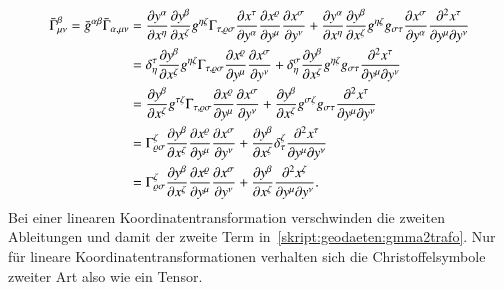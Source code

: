 \begin{align}
\bar\Gamma^\beta_{\mu\nu}
=
\bar g^{\alpha\beta}
\bar\Gamma_{\alpha,\mu\nu}
&=
\frac{\partial y^\alpha}{\partial x^\eta}
\frac{\partial y^\beta}{\partial x^\zeta}
g^{\eta\zeta}
\Gamma_{\tau,\varrho\sigma}
\frac{\partial x^\tau}{\partial y^\alpha}
\frac{\partial x^\varrho}{\partial y^\mu}
\frac{\partial x^\sigma}{\partial y^\nu}
+
\frac{\partial y^\alpha}{\partial x^\eta}
\frac{\partial y^\beta}{\partial x^\zeta}
g^{\eta\zeta}
g_{\sigma\tau}
\frac{\partial x^\sigma}{\partial y^\alpha}
\frac{\partial^2 x^\tau}{\partial y^\mu\partial y^\nu}
\notag
\\
&=
\delta^\tau_\eta
\frac{\partial y^\beta}{\partial x^\zeta}
g^{\eta\zeta}
\Gamma_{\tau,\varrho\sigma}
\frac{\partial x^\varrho}{\partial y^\mu}
\frac{\partial x^\sigma}{\partial y^\nu}
+
\delta^\sigma_\eta
\frac{\partial y^\beta}{\partial x^\zeta}
g^{\eta\zeta}
g_{\sigma\tau}
\frac{\partial^2 x^\tau}{\partial y^\mu\partial y^\nu}
\notag
\\
&=
\frac{\partial y^\beta}{\partial x^\zeta}
g^{\tau\zeta}
\Gamma_{\tau,\varrho\sigma}
\frac{\partial x^\varrho}{\partial y^\mu}
\frac{\partial x^\sigma}{\partial y^\nu}
+
\frac{\partial y^\beta}{\partial x^\zeta}
g^{\sigma\zeta}
g_{\sigma\tau}
\frac{\partial^2 x^\tau}{\partial y^\mu\partial y^\nu}
\notag
\\
&=
\Gamma^\zeta_{\varrho\sigma}
\frac{\partial y^\beta}{\partial x^\zeta}
\frac{\partial x^\varrho}{\partial y^\mu}
\frac{\partial x^\sigma}{\partial y^\nu}
+
\frac{\partial y^\beta}{\partial x^\zeta}
\delta^\zeta_\tau
\frac{\partial^2 x^\tau}{\partial y^\mu\partial y^\nu}
\notag
\\
&=
\Gamma^\zeta_{\varrho\sigma}
\frac{\partial y^\beta}{\partial x^\zeta}
\frac{\partial x^\varrho}{\partial y^\mu}
\frac{\partial x^\sigma}{\partial y^\nu}
+
\frac{\partial y^\beta}{\partial x^\zeta}
\frac{\partial^2 x^\zeta}{\partial y^\mu\partial y^\nu}.
\label{skript:geodaeten:gmma2trafo}
\end{align}
Bei einer linearen Koordinatentransformation verschwinden die zweiten
Ableitungen und damit der zweite Term in~\eqref{skript:geodaeten:gmma2trafo}.
Nur für lineare Koordinatentransformationen verhalten sich die
Christoffelsymbole zweiter Art also wie ein Tensor.



